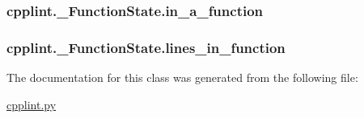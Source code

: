 \subsubsection[{\texorpdfstring{in\+\_\+a\+\_\+function}{in_a_function}}]{\setlength{\rightskip}{0pt plus 5cm}cpplint.\+\_\+\+Function\+State.\+in\+\_\+a\+\_\+function}\hypertarget{classcpplint_1_1__FunctionState_a8362d472591f60462184bf68b49c0efb}{}\label{classcpplint_1_1__FunctionState_a8362d472591f60462184bf68b49c0efb}
\subsubsection[{\texorpdfstring{lines\+\_\+in\+\_\+function}{lines_in_function}}]{\setlength{\rightskip}{0pt plus 5cm}cpplint.\+\_\+\+Function\+State.\+lines\+\_\+in\+\_\+function}\hypertarget{classcpplint_1_1__FunctionState_a886f5d476adc81f499a711750a399aa2}{}\label{classcpplint_1_1__FunctionState_a886f5d476adc81f499a711750a399aa2}


The documentation for this class was generated from the following file\+:\begin{DoxyCompactItemize}
\item 
\hyperlink{cpplint_8py}{cpplint.\+py}\end{DoxyCompactItemize}
